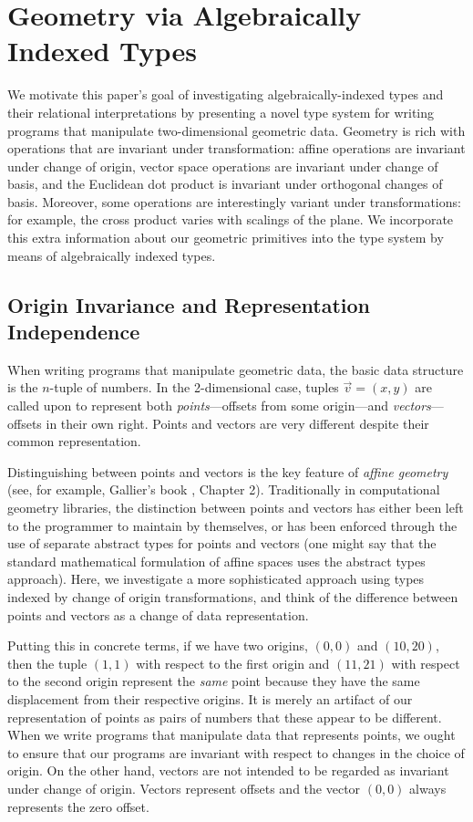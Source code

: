 \section{Geometry via Algebraically Indexed Types}
\label{sec:motivating-examples}

We motivate this paper's goal of investigating algebraically-indexed
types and their relational interpretations by presenting a novel type
system for writing programs that manipulate two-dimensional geometric
data. Geometry is rich with operations that are invariant under
transformation: affine operations are invariant under change of
origin, vector space operations are invariant under change of basis,
and the Euclidean dot product is invariant under orthogonal changes of
basis. Moreover, some operations are interestingly variant under
transformations: for example, the cross product varies with scalings
of the plane. We incorporate this extra information about our
geometric primitives into the type system by means of algebraically
indexed types.

\subsection{Origin Invariance and Representation Independence}

When writing programs that manipulate geometric data, the basic data
structure is the $n$-tuple of numbers. In the 2-dimensional case,
tuples $\vec{v} = (x,y)$ are called upon to represent both
\emph{points}---offsets from some origin---and
\emph{vectors}---offsets in their own right. Points and vectors are
very different despite their common representation.

Distinguishing between points and vectors is the key feature of
\emph{affine geometry} (see, for example, Gallier's book
\cite{gallier11geometric}, Chapter 2). Traditionally in computational
geometry libraries, the distinction between points and vectors has
either been left to the programmer to maintain by themselves, or has
been enforced through the use of separate abstract types for points
and vectors (one might say that the standard mathematical formulation
of affine spaces uses the abstract types approach). Here, we
investigate a more sophisticated approach using types indexed by
change of origin transformations, and think of the difference between
points and vectors as a change of data representation.

Putting this in concrete terms, if we have two origins, $(0,0)$ and
$(10,20)$, then the tuple $(1,1)$ with respect to the first origin and
$(11,21)$ with respect to the second origin represent the \emph{same}
point because they have the same displacement from their respective
origins. It is merely an artifact of our representation of points as
pairs of numbers that these appear to be different. When we write
programs that manipulate data that represents points, we ought to
ensure that our programs are invariant with respect to changes in the
choice of origin. On the other hand, vectors are not intended to be
regarded as invariant under change of origin. Vectors represent
offsets and the vector $(0,0)$ always represents the zero offset.

